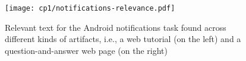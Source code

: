 \begin{landscape}
\begin{figure}
    \centering
    \texttt{[image: cp1/notifications-relevance.pdf]}
    \caption{Relevant text for the Android notifications task found across different kinds of artifacts, i.e., a web tutorial (on the left) and a question-and-answer web page (on the right) }
    \label{fig:anatomy-of-relevant-text}
\end{figure}
\end{landscape}

\clearpage


































